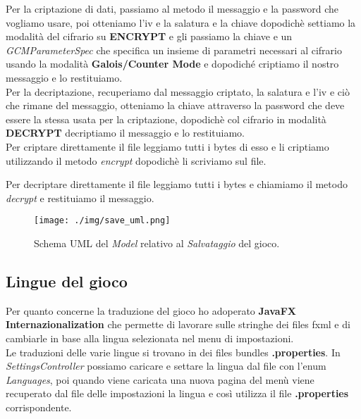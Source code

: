 \textsf{\small Per la criptazione di dati, passiamo al metodo il messaggio e la password che vogliamo usare, poi otteniamo l'iv e la salatura e la chiave dopodichè settiamo la modalità del cifrario su \textbf{ENCRYPT} e gli passiamo la chiave e un \emph{GCMParameterSpec} che specifica un insieme di parametri necessari al cifrario usando la modalità \textbf{Galois/Counter Mode} e dopodiché criptiamo il nostro messaggio e lo restituiamo.} \\

\textsf{\small Per la decriptazione, recuperiamo dal messaggio criptato, la salatura e l'iv e ciò che rimane del messaggio, otteniamo la chiave attraverso la password che deve essere la stessa usata per la criptazione, dopodichè col cifrario in modalità \textbf{DECRYPT} decriptiamo il messaggio e lo restituiamo.} \\

\textsf{\small Per criptare direttamente il file leggiamo tutti i bytes di esso e li criptiamo utilizzando il metodo \emph{encrypt} dopodichè li scriviamo sul file.} 

\textsf{\small Per decriptare direttamente il file leggiamo tutti i bytes e chiamiamo il metodo \emph{decrypt} e restituiamo il messaggio.} \\

\begin{figure}[H]
	\centering{}
	\texttt{[image: ./img/save\_uml.png]} 
	\caption{Schema UML del \emph{Model} relativo al \emph{Salvataggio} del gioco.}
	\label{img:save_uml}
\end{figure}

\subsection{Lingue del gioco}

\textsf{\small Per quanto concerne la traduzione del gioco ho adoperato \textbf{JavaFX Internazionalization} che permette di lavorare sulle stringhe dei files fxml e di cambiarle in base alla lingua selezionata nel menu di impostazioni.} \\

\textsf{\small Le traduzioni delle varie lingue si trovano in dei files bundles \textbf{.properties}. In \emph{SettingsController} possiamo caricare e settare la lingua dal file con l'enum \emph{Languages}, poi quando viene caricata una nuova pagina del menù viene recuperato dal file delle impostazioni la lingua e così utilizza il file \textbf{.properties} corrispondente.} \\